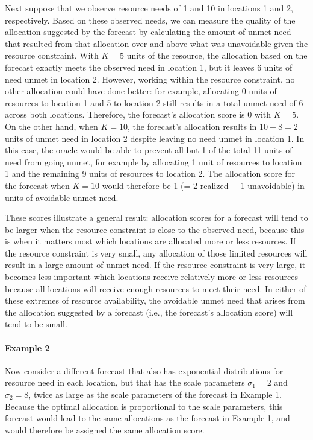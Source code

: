 \documentclass{article}\usepackage[]{graphicx}\usepackage[]{xcolor}
\begin{document}
Next suppose that we observe resource needs of 1 and 10 in locations 1 and 2, respectively.
Based on these observed needs, we can measure the quality of the allocation suggested by the forecast by calculating the amount of unmet need that resulted from that allocation over and above what was unavoidable given the resource constraint.
With $K = 5$ units of the resource, the allocation based on the forecast exactly meets the observed need in location 1, but it leaves 6 units of need unmet in location 2.
However, working within the resource constraint, no other allocation could have done better: for example, allocating 0 units of resources to location 1 and 5 to location 2 still results in a total unmet need of 6 across both locations. Therefore, the forecast's allocation score is 0 with $K = 5$.
On the other hand, when $K = 10$, the forecast's allocation results in $10 - 8 = 2$ units of unmet need in location 2 despite leaving no need unmet in location 1.
In this case, the oracle would be able to prevent all but 1 of the total 11 units of need from going unmet, for example by allocating 1 unit of resources to location 1 and the remaining 9 units of resources to location 2.
The allocation score for the forecast when $K = 10$ would therefore be 1 (= 2 realized $-$ 1 unavoidable) in units of avoidable unmet need.

These scores illustrate a general result: allocation scores for a forecast will tend to be larger when the resource constraint is close to the observed need, because this is when it matters most which locations are allocated more or less resources. If the resource constraint is very small, any allocation of those limited resources will result in a large amount of unmet need. If the resource constraint is very large, it becomes less important which locations receive relatively more or less resources because all locations will receive enough resources to meet their need. In either of these extremes of resource availability, the avoidable unmet need that arises from the allocation suggested by a forecast (i.e., the forecast's allocation score) will tend to be small.

\paragraph{Example 2} Now consider a different forecast that also has exponential distributions for resource need in each location, but that has the scale parameters $\sigma_1 = 2$ and $\sigma_2 = 8$, twice as large as the scale parameters of the forecast in Example 1. Because the optimal allocation is proportional to the scale parameters, this forecast would lead to the same allocations as the forecast in Example 1, and would therefore be assigned the same allocation score.
\end{document}
